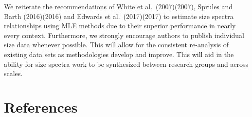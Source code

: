\documentclass[
]{article}
\begin{document}
We reiterate the recommendations of White et al.~(2007)(2007), Sprules
and Barth (2016)(2016) and Edwards et al.~(2017)(2017) to estimate size
spectra relationships using MLE methods due to their superior
performance in nearly every context. Furthermore, we strongly encourage
authors to publish individual size data whenever possible. This will
allow for the consistent re-analysis of existing data sets as
methodologies develop and improve. This will aid in the ability for size
spectra work to be synthesized between research groups and across
scales.

\newpage

\hypertarget{references}{%
\section{References}\label{references}}
\end{document}
